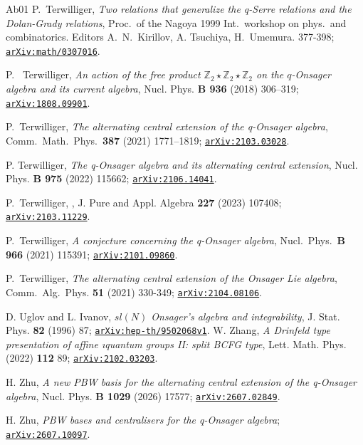 \documentclass[11pt]{amsart}
\numberwithin{equation}{section}
\numberwithin{equation}{section}
\begin{document}
\begin{thebibliography}{Ab01}
P.\ Terwilliger, {\it Two relations that generalize the q-Serre
	relations and the Dolan-Grady relations}, Proc.\ of the Nagoya 1999 Int.\ workshop on phys.\ and combinatorics. Editors A.\ N.\ Kirillov, A. Tsuchiya, H.\ Umemura. 377-398; \href{https://arxiv.org/abs/math/0307016}{\tt  arXiv:math/0307016}.


P. \ Terwilliger, {\it An action of the free product ${\mathbb Z}_2 \star {\mathbb Z}_2 \star {\mathbb Z}_2$ on the $q$-Onsager algebra and
	its current algebra},  Nucl. Phys. {\bf B 936} (2018) 306–319; \href{https://arxiv.org/abs/1808.09901}{\tt arXiv:1808.09901}. 


			P.\ Terwilliger, {\it The alternating central extension of the
				q-Onsager algebra}, Comm.\ Math.\ Phys.\ {\bf 387}  (2021) 1771–1819;
			\href{https://arxiv.org/abs/2103.03028}{\tt arXiv:2103.03028}.
			
			P. Terwilliger, {\it The q-Onsager algebra and its alternating central extension}, Nucl. Phys. {\bf B
			975} (2022) 115662; 	\href{https://arxiv.org/abs/2106.14041}{\tt arXiv:2106.14041}.
		
		
		
		P.\ Terwilliger, , J. Pure and Appl. Algebra {\bf 227} (2023) 107408; \href{https://arxiv.org/abs/2103.11229}{\tt arXiv:2103.11229}.
			
	P.\ Terwilliger, {\it A conjecture concerning the q-Onsager algebra}, Nucl.\ Phys.\ {\bf B 966} (2021) 115391; \href{https://arxiv.org/abs/2101.09860}{\tt arXiv:2101.09860}.
	
	P.\ Terwilliger, \textit{The alternating central extension of the Onsager Lie algebra}, Comm.\ Alg.\ Phys. {\bf 51} (2021) 330-349; \href{https://arxiv.org/abs/2104.08106}{\tt arXiv:2104.08106}.
	
	
D. Uglov and L. Ivanov, {\it $sl(N)$ Onsager's algebra and integrability}, J. Stat. Phys. {\bf 82} (1996) 87; \href{https://arxiv.org/abs/9502068v1}{\tt arXiv:hep-th/9502068v1}.
W. Zhang, {\it A Drinfeld type presentation of affine ıquantum groups II: split BCFG type}, Lett. Math. Phys. (2022) {\bf 112} 89;  \href{https://arxiv.org/abs/2102.03203}{\tt  arXiv:2102.03203}.

H. Zhu, {\it A new PBW basis for the alternating central extension of the q-Onsager algebra}, Nucl. Phys. {\bf B 1029} (2026) 17577; \href{https://arxiv.org/abs/2607.02849}{\tt arXiv:2607.02849}.

H. Zhu, {\it PBW bases and centralisers for the q-Onsager algebra}; \href{https://arxiv.org/pdf/2607.10097}{\tt arXiv:2607.10097}.


\end{thebibliography}
\end{document}
